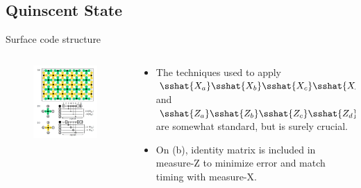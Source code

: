 \documentclass{beamer}
\begin{document}
    \subsection{Quinscent State}
    \begin{frame}{Surface code structure}
        \begin{minipage}[0.65\textheight]{\textwidth}
        \begin{columns}[T]
            \begin{column}{0.4\textwidth}
                \begin{figure}[h]
                    \centering
                    \includegraphics[height=0.6\textheight]{./Images/surf-code-overview.jpg}
                \end{figure}
            \end{column}
            \begin{column}{0.6\textwidth}
                    \begin{itemize}
                    \item The techniques used to apply $ \sshat{X_a}\sshat{X_b}\sshat{X_c}\sshat{X_d} $ and $ \sshat{Z_a}\sshat{Z_b}\sshat{Z_c}\sshat{Z_d} $ are somewhat standard, but is surely crucial.
                    \item On (b), identity matrix is included in measure-Z to minimize error and match timing with measure-X.
                    \end{itemize}
            \end{column}
        \end{columns}
        
        \end{minipage}
        
    \end{frame}
\end{document}
